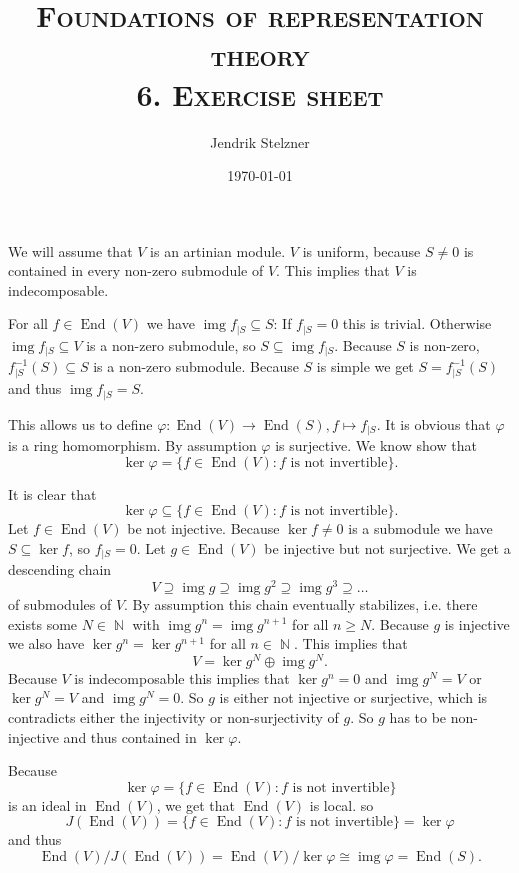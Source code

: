 \documentclass[a4paper,10pt]{article}
\title{\textsc{Foundations of representation theory \\ \Large 6. Exercise sheet}}
\author{Jendrik Stelzner}
\date{\today}
\theoremstyle{definition}
\newcommand{\N}{\operatorname{\mathbb{N}}}
\newcommand{\End}{\operatorname{End}}
\newcommand{\img}{\operatorname{img}}
\begin{document}
\maketitle





\section{}
We will assume that $V$ is an artinian module.
$V$ is uniform, because $S \neq 0$ is contained in every non-zero submodule of $V$. This implies that $V$ is indecomposable.

For all $f \in \End(V)$ we have $\img f_{|S} \subseteq S$: If $f_{|S} = 0$ this is trivial. Otherwise $\img f_{|S} \subseteq V$ is a non-zero submodule, so $S \subseteq \img f_{|S}$. Because $S$ is non-zero, $f^{-1}_{|S}(S) \subseteq S$ is a non-zero submodule. Because $S$ is simple we get $S = f^{-1}_{|S} (S)$ and thus $\img f_{|S} = S$.

This allows us to define $\varphi : \End(V) \rightarrow \End(S), f \mapsto f_{|S}$. It is obvious that $\varphi$ is a ring homomorphism. By assumption $\varphi$ is surjective. We know show that \[ \ker \varphi = \{f \in \End(V) : \text{$f$ is not invertible}\}. \]

It is clear that \[\ker \varphi \subseteq \{f \in \End(V) : \text{$f$ is not invertible}\}.\] Let $f \in \End(V)$ be not injective. Because $\ker f \neq 0$ is a submodule we have $S \subseteq \ker f$, so $f_{|S} = 0$. Let $g \in \End(V)$ be injective but not surjective. We get a descending chain
\[
 V \supseteq \img g \supseteq \img g^2 \supseteq \img g^3 \supseteq \ldots
\]
of submodules of $V$. By assumption this chain eventually stabilizes, i.e. there exists some $N \in \N$ with $\img g^n = \img g^{n+1}$ for all $n \geq N$. Because $g$ is injective we also have $\ker g^n = \ker g^{n+1}$ for all $n \in \N$. This implies that
\[
 V = \ker g^N \oplus \img g^N.
\]
Because $V$ is indecomposable this implies that $\ker g^n = 0$ and $\img g^N = V$ or $\ker g^N = V$ and $\img g^N = 0$. So $g$ is either not injective or surjective, which is contradicts either the injectivity or non-surjectivity of $g$. So $g$ has to be non-injective and thus contained in $\ker \varphi$.

Because
\[
 \ker \varphi = \{f \in \End(V) : \text{$f$ is not invertible}\}
\]
is an ideal in $\End(V)$, we get that $\End(V)$ is local. so
\[
 J(\End(V)) = \{f \in \End(V) : \text{$f$ is not invertible}\} = \ker \varphi
\]
and thus
\[
 \End(V) / J(\End(V)) = \End(V) / \ker \varphi \cong \img \varphi = \End(S).
\]
\end{document}
